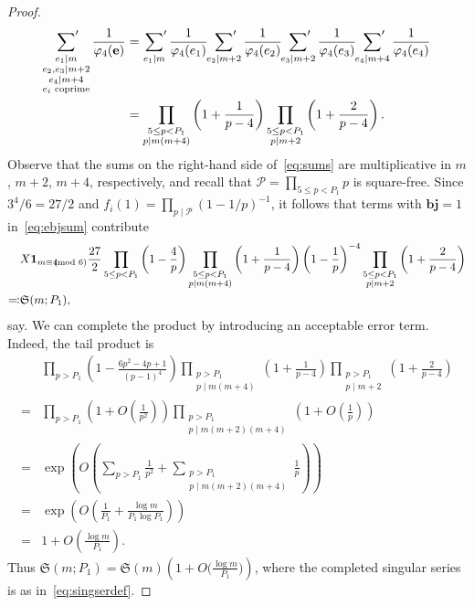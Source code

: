 \documentclass[12pt]{amsart}
\theoremstyle{definition}
\theoremstyle{remark}
\numberwithin{equation}{section}
\newcommand{\1}{\mathbf{1}}
\let\oldpmod\pmod
\renewcommand{\pmod}[1]{\hspace{-0.12cm}\oldpmod {#1}}
\begin{document}
\begin{proof}
    \begin{align}\label{eq:sums}
        \sideset{}{'}\sum_{\substack{e_1\mid m\\ e_2, e_3\mid  m+2 \\ e_4\mid m+4 \\ e_i \text{ coprime}}}\frac{1}{\varphi_4(\mathbf{e})}&= \sideset{}{'}\sum_{\substack{e_1\mid m}}\frac{1}{\varphi_4(e_1)}\sideset{}{'}\sum_{\substack{e_2\mid m+2}}\frac{1}{\varphi_4(e_2)}\sideset{}{'}\sum_{\substack{e_3\mid m+2}}\frac{1}{\varphi_4(e_3)}\sideset{}{'}\sum_{\substack{e_4\mid m+4}}\frac{1}{\varphi_4(e_4)}\\
        &=\prod_{\substack{5\leq p< P_1\\ p\mid m(m+4)}}\left(1+\frac{1}{p-4}\right)\prod_{\substack{5\leq p< P_1\\ p\mid m+2}}\left(1+\frac{2}{p-4}\right).\nonumber
    \end{align}
    Observe that the sums on the right-hand side of~\eqref{eq:sums} are multiplicative in $m$, $m+2$, $m+4$, respectively, and recall that $\mathcal{P}=\prod_{5\leq p < P_1}p$ is square-free. Since $3^4/6=27/2$ and $f_i(1)=\prod_{p\mid \mathcal{P}}(1-1/p)^{-1}$, it follows that terms with  $\mathbf{b}\mathbf{j}=1$ in~\eqref{eq:ebjsum} contribute
	\begin{align*}
    &X \1_{m\equiv 4\pmod 6}\frac{27}{2}\prod_{5\leq p < P_1}\left(1-\frac{4}{p}\right)\prod_{\substack{5\leq p< P_1\\ p\mid m(m+4)}}\left(1+\frac{1}{p-4}\right)\left(1-\frac{1}{p}\right)^{-4}\prod_{\substack{5\leq p < P_1\\ p\mid m+2}}\left(1+\frac{2}{p-4}\right)\\
    \eqqcolon& \mathfrak{S}(m;P_1),
	\end{align*}
    say.
    We can complete the product by introducing an acceptable error term. Indeed, the tail product is
	\begin{align*}
		&\prod_{p>P_1}\left(1-\frac{6p^2-4p+1}{(p-1)^4}\right)\prod_{\substack{p>P_1\\ p\mid m(m+4)}}\left(1+\frac{1}{p-4}\right)\prod_{\substack{p>P_1\\ p\mid m+2}}\left(1+\frac{2}{p-4}\right)\\
		=&   \prod_{p>P_1}\left(1+O\left(\frac{1}{p^2}\right) \right)\prod_{\substack{p>P_1\\ p\mid m(m+2)(m+4)}}\left(1+O\left(\frac{1}{p}\right) \right)\\
		=&\exp\left(O\left(\sum_{p>P_1}\frac{1}{p^2}+\sum_{\substack{p>P_1\\ p\mid m(m+2)(m+4)}}\frac{1}{p}\right)\right)\\
		=&\exp\left(O\left(\frac{1}{P_1}+\frac{\log m}{P_1 \log P_1}\right)\right)\\
		=&1+O\left(\frac{\log m}{P_1}\right).
	\end{align*}
 Thus $\mathfrak{S}(m;P_1)=\mathfrak{S}(m)\left(1+O\bigl(\frac{\log m}{P_1}\bigr)\right)$, where the completed singular series is as in~\eqref{eq:singserdef}. 
		


\end{proof}
\end{document}
